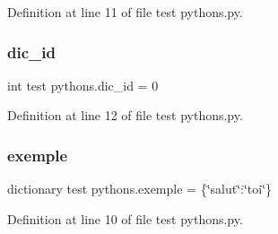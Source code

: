 Definition at line 11 of file test pythons.\+py.

\mbox{\label{namespacetest_01pythons_a1b2b80b8dfe0ff2a6dd68f854342c9c5}} 
\subsubsection{\texorpdfstring{dic\+\_\+id}{dic\_id}}
{\footnotesize\ttfamily int test pythons.\+dic\+\_\+id = 0}



Definition at line 12 of file test pythons.\+py.

\mbox{\label{namespacetest_01pythons_a8e0bfabcfdd19185e780cd2061449b37}} 
\subsubsection{\texorpdfstring{exemple}{exemple}}
{\footnotesize\ttfamily dictionary test pythons.\+exemple = \{\char`\"{}salut\char`\"{}\+:\char`\"{}toi\char`\"{}\}}



Definition at line 10 of file test pythons.\+py.

